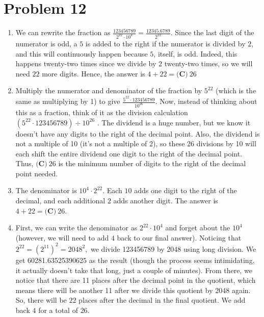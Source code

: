 \documentclass{article}%
\begin{document}
\section*{Problem 12}%
\label{sec:Problem12}%
\begin{enumerate}%
\item%
We can rewrite the fraction as $\frac{123456789}{2^{22} \cdot 10^4} = \frac{12345.6789}{2^{22}}$. Since the last digit of the numerator is odd, a $5$ is added to the right if the numerator is divided by $2$, and this will continuously happen because $5$, itself, is odd. Indeed, this happens twenty-two times since we divide by $2$ twenty-two times, so we will need $22$ more digits. Hence, the answer is $4 + 22 = \boxed{\textbf{(C)}\ 26}$

%
\item%
Multiply the numerator and denominator of the fraction by $5^{22}$ (which is the same as multiplying by 1) to give $\frac{5^{22} \cdot 123456789}{10^{26}}$. Now, instead of thinking about this as a fraction, think of it as the division calculation $(5^{22} \cdot 123456789) \div 10^{26}$ . The dividend is a huge number, but we know it doesn't have any digits to the right of the decimal point. Also, the dividend is not a multiple of 10 (it's not a multiple of 2), so these 26 divisions by 10 will each shift the entire dividend one digit to the right of the decimal point. Thus, 
$\boxed{\textbf{(C)}\ 26}$ is the minimum number of digits to the right of the decimal point needed.

%
\item%
The denominator is $10^4 \cdot 2^{22}$. Each $10$ adds one digit to the right of the decimal, and each additional $2$ adds another digit. The answer is $4 + 22 = \boxed{\textbf{(C)}\ 26}$.

%
\item%
First, we can write the denominator as $2^{22}\cdot 10^4$ and forget about the $10^4$ (however, we will need to add $4$ back to our final answer). Noticing that $2^{22}=\left(2^{11} \right)^2=2048^2,$ we divide 123456789 by 2048 using long division. We get 60281.63525390625 as the result (though the process seems intimidating, it actually doesn't take that long, just a couple of minutes). From there, we notice that there are 11 places after the decimal point in the quotient, which means there will be another 11 after we divide this quotient by 2048 again. So, there will be $22$ places after the decimal in the final quotient. We add back $4$ for a total of $26.$

%
\end{enumerate}
\end{document}
